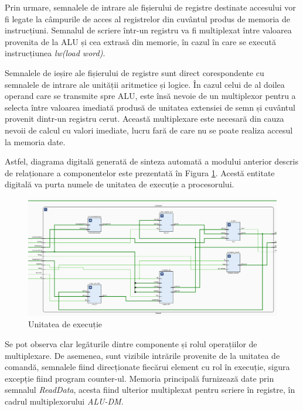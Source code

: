 \documentclass[12pt]{article}
\begin{document}
Prin urmare, semnalele de intrare ale fișierului de registre destinate accesului vor fi legate la câmpurile de acces al registrelor din cuvântul produs de memoria de instrucțiuni. Semnalul de scriere într-un registru va fi multiplexat între valoarea provenita de la ALU și cea extrasă din memorie, în cazul în care se execută instrucțiunea \textit{lw(load word)}.

 Semnalele de ieșire ale fișierului de registre sunt direct corespondente cu semnalele de intrare ale unității aritmetice și logice. În cazul celui de al doilea operand care se transmite spre ALU,  este însă nevoie de un multiplexor pentru a selecta între valoarea imediată produsă de unitatea extensiei de semn și cuvântul provenit dintr-un registru cerut. Această multiplexare este necesară din cauza nevoii de calcul cu valori imediate, lucru fară de care nu se poate realiza accesul la memoria date.
 
Astfel, diagrama digitală generată de sinteza automată a modului anterior descris de relaționare a componentelor este prezentată în Figura \ref{Figura:51}. Acestă entitate digitală va purta numele de unitatea de execuție a procesorului.

 \begin{figure}[h!]
 \includegraphics[width=1.0\textwidth]{execunit.png}
 \centering
 \caption{Unitatea de execuție}
 \label{Figura:51}
 \end{figure}
 
Se pot observa clar legăturile dintre componente și rolul operațiilor de multiplexare. De asemenea, sunt vizibile intrările provenite de la unitatea de comandă, semnalele fiind direcționate fiecărui element cu rol în execuție, sigura excepție fiind program counter-ul. Memoria principală furnizează date prin semnalul  \textit{ReadData}, acesta fiind ulterior multiplexat pentru scriere în registre, în cadrul multiplexorului  \textit{ALU-DM}.
\end{document}
